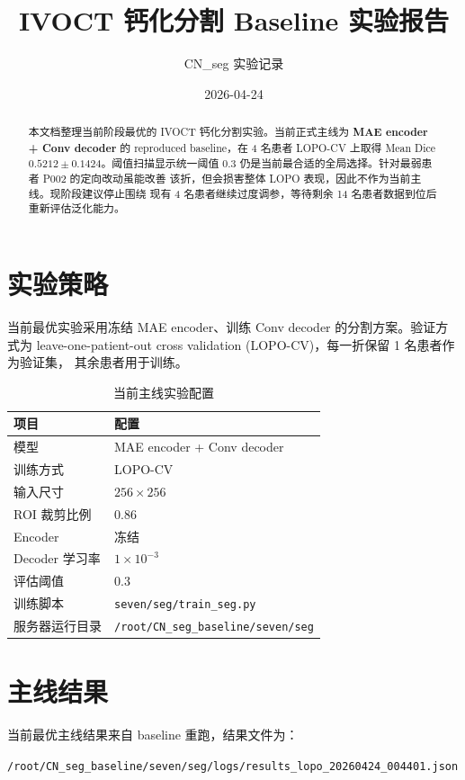 \documentclass[UTF8,11pt]{ctexart}
\title{IVOCT 钙化分割 Baseline 实验报告}
\author{CN\_seg 实验记录}
\date{2026-04-24}
\begin{document}
\maketitle

\begin{abstract}
本文档整理当前阶段最优的 IVOCT 钙化分割实验。当前正式主线为
\textbf{MAE encoder + Conv decoder} 的 reproduced baseline，在 4 名患者
LOPO-CV 上取得 Mean Dice $0.5212 \pm 0.1424$。阈值扫描显示统一阈值
$0.3$ 仍是当前最合适的全局选择。针对最弱患者 P002 的定向改动虽能改善
该折，但会损害整体 LOPO 表现，因此不作为当前主线。现阶段建议停止围绕
现有 4 名患者继续过度调参，等待剩余 14 名患者数据到位后重新评估泛化能力。
\end{abstract}

\section{实验策略}

当前最优实验采用冻结 MAE encoder、训练 Conv decoder 的分割方案。验证方式为
leave-one-patient-out cross validation (LOPO-CV)，每一折保留 1 名患者作为验证集，
其余患者用于训练。

\begin{table}[htbp]
\centering
\caption{当前主线实验配置}
\begin{tabular}{ll}
\toprule
项目 & 配置 \\
\midrule
模型 & MAE encoder + Conv decoder \\
训练方式 & LOPO-CV \\
输入尺寸 & $256 \times 256$ \\
ROI 裁剪比例 & 0.86 \\
Encoder & 冻结 \\
Decoder 学习率 & $1 \times 10^{-3}$ \\
评估阈值 & 0.3 \\
训练脚本 & \texttt{seven/seg/train\_seg.py} \\
服务器运行目录 & \texttt{/root/CN\_seg\_baseline/seven/seg} \\
\bottomrule
\end{tabular}
\end{table}

\section{主线结果}

当前最优主线结果来自 baseline 重跑，结果文件为：

\begin{center}
\texttt{/root/CN\_seg\_baseline/seven/seg/logs/results\_lopo\_20260424\_004401.json}
\end{center}
\end{document}
